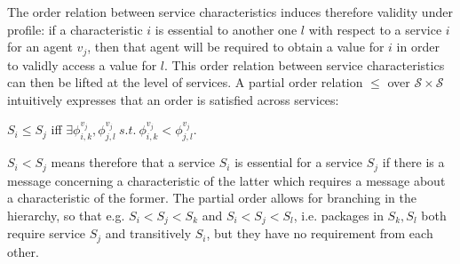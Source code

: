 \documentclass[]{llncs}
\begin{document}
The order relation between service characteristics induces therefore validity under profile: if a characteristic $i$ is essential to another one $l$ with respect to a service $i$ for an agent $v_{j}$, then that agent will be required to obtain a value for  $i$ in order to validly access a value for $l$. This order relation between service characteristics can then be lifted at the level of services. A partial order relation $\leq$ over $\mathcal{S}\times \mathcal{S}$ intuitively expresses that an order is satisfied across services: 

\begin{definition}\label{def:orderrepos}
	$S_{i}\leq S_{j}$  iff $\exists \phi^{v_{j}}_{i,k},\phi^{v_{j}}_{j,l}\ s.t.\ \phi^{v_{j}}_{i,k}<\phi^{v_{j}}_{j,l}$.
\end{definition}
$S_{i}< S_{j}$ means therefore that a service $S_{i}$ is essential for a service $S_{j}$ if there is a message concerning a characteristic of the latter which requires a message about a characteristic of the former. 
The partial order allows for branching in the hierarchy, so that e.g. $S_{i}<S_{j}<S_{k}$ and $S_{i}<S_{j}<S_{l}$,  i.e. packages in $S_{k},S_{l}$  both require service $S_{j}$ and transitively $S_{i}$, but they have no requirement from each other. 
\end{document}
